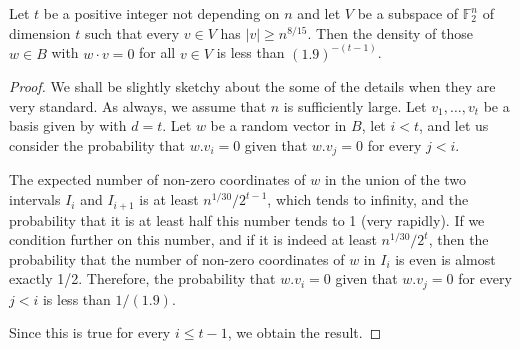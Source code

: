 \documentclass{toc}
\begin{document}
\begin{corollary}\label{Claim1} Let $t$ be a positive integer not depending on $n$ and let $V$ be a subspace of $\mathbb{F}_2^n$ of dimension $t$ such that every $v\in V$ has $|v|\geq n^{8/15}$. Then the density of those $w\in B$ with $w\cdot v=0$ for all $v\in V$ is less than $(1.9)^{-(t-1)}$.
\end{corollary}

\begin{proof}
	We shall be slightly sketchy about the some of the details when they are very standard. As always, we assume that $n$ is sufficiently large. Let $v_1,\dots,v_t$ be a basis given by  with $d=t$. Let $w$ be a random vector in $B$, let $i<t$, and let us consider the probability that $w.v_i=0$ given that $w.v_j=0$ for every $j<i$. 
	
	The expected number of non-zero coordinates of $w$ in the union of the two intervals $I_i$ and $I_{i+1}$ is at least $n^{1/30}/2^{t-1}$, which tends to infinity, and the probability that it is at least half this number tends to 1 (very rapidly). If we condition further on this number, and if it is indeed at least $n^{1/30}/2^t$, then the probability that the number of non-zero coordinates of $w$ in $I_i$ is even is almost exactly 1/2. Therefore,  the probability that $w.v_i=0$ given that $w.v_j=0$ for every $j<i$ is less than $1/(1.9)$. 
	
	Since this is true for every $i\leq t-1$, we obtain the result. 
\end{proof}
\end{document}
